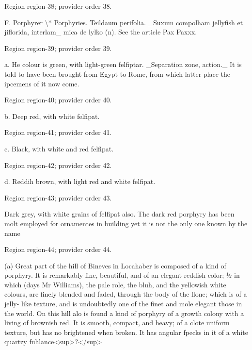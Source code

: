 \documentclass[11pt]{article}
\begin{document}
{\scriptsize\color{gray} Region region-38; provider order 38.\par}
\medskip

F. Porphyrer \textbackslash{}* Porphyries. Teildaum perifolia. \_Suxum compolham jellyfish et jiflorida, interlam\_
mica de lylko (n). See the article Pax Paxxx.
\par

{\scriptsize\color{gray} Region region-39; provider order 39.\par}
\medskip

a. He colour is green, with light-green felfiptar. \_Separation zone, action.\_ It is told to have been brought from Egypt to Rome, from which latter place the ipcemens of it now come.
\par

{\scriptsize\color{gray} Region region-40; provider order 40.\par}
\medskip

b. Deep red, with white felfipat.
\par

{\scriptsize\color{gray} Region region-41; provider order 41.\par}
\medskip

c. Black, with white and red felfipat.
\par

{\scriptsize\color{gray} Region region-42; provider order 42.\par}
\medskip

d. Reddih brown, with light red and white felfipat.
\par

{\scriptsize\color{gray} Region region-43; provider order 43.\par}
\medskip

Dark grey, with white grains of felfipat also. The dark red porphyry has been molt employed for ornamentes in building yet it is not the only one known by the name
\par

{\scriptsize\color{gray} Region region-44; provider order 44.\par}
\medskip

(a) Great part of the hill of Bineves in Locahaber is composed of a kind of porphyry. It is remarkably fine, beautiful, and of an elegant reddish color; 1⁄2 in which (days Mr Williams), the pale role, the bluh, and the yellowish white colours, are finely blended and faded, through the body of the flone; which is of a jelly- like texture, and is undoubtedly one of the finet and mole elegant those in the world. On this hill alo is found a kind of porphyry of a growth colony with a living of brownish red. It is smooth, compact, and heavy; of a clote uniform texture, but has no brightened when broken. It has angular fpecks in it of a white quartzy fuhlance<sup>?</sup>
\par
\end{document}

